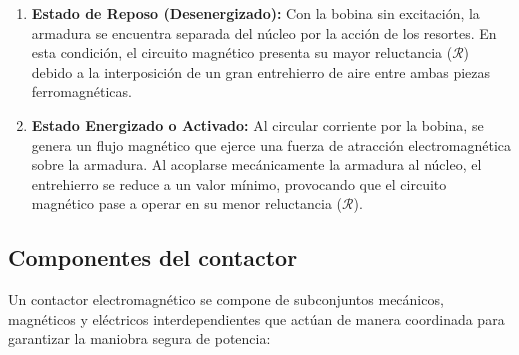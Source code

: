 \begin{enumerate}
    \item \textbf{Estado de Reposo (Desenergizado):} Con la bobina sin excitación, la armadura se encuentra separada del núcleo por la acción de los resortes. En esta condición, el circuito magnético presenta su mayor reluctancia ($\mathcal{R}$) debido a la interposición de un gran entrehierro de aire entre ambas piezas ferromagnéticas.
    \item \textbf{Estado Energizado o Activado:} Al circular corriente por la bobina, se genera un flujo magnético que ejerce una fuerza de atracción electromagnética sobre la armadura. Al acoplarse mecánicamente la armadura al núcleo, el entrehierro se reduce a un valor mínimo, provocando que el circuito magnético pase a operar en su menor reluctancia ($\mathcal{R}$).
\end{enumerate}


\subsection{Componentes del contactor}

Un contactor electromagnético se compone de subconjuntos mecánicos, magnéticos y eléctricos interdependientes que actúan de manera coordinada para garantizar la maniobra segura de potencia:

